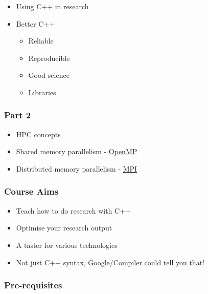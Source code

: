 \begin{itemize}
\tightlist
\item
  Using C++ in research
\item
  Better C++

  \begin{itemize}
  \tightlist
  \item
    Reliable
  \item
    Reproducible
  \item
    Good science
  \item
    Libraries
  \end{itemize}
\end{itemize}

\hypertarget{part-2}{%
\subsubsection{Part 2}\label{part-2}}

\begin{itemize}
\tightlist
\item
  HPC concepts
\item
  Shared memory parallelism - \href{http://www.openmp.org}{OpenMP}
\item
  Distributed memory parallelism - \href{http://www.open-mpi.org}{MPI}
\end{itemize}

\hypertarget{course-aims}{%
\subsubsection{Course Aims}\label{course-aims}}

\begin{itemize}
\tightlist
\item
  Teach how to do research with C++
\item
  Optimise your research output
\item
  A taster for various technologies
\item
  Not just C++ syntax, Google/Compiler could tell you that!
\end{itemize}

\hypertarget{pre-requisites}{%
\subsubsection{Pre-requisites}\label{pre-requisites}}

